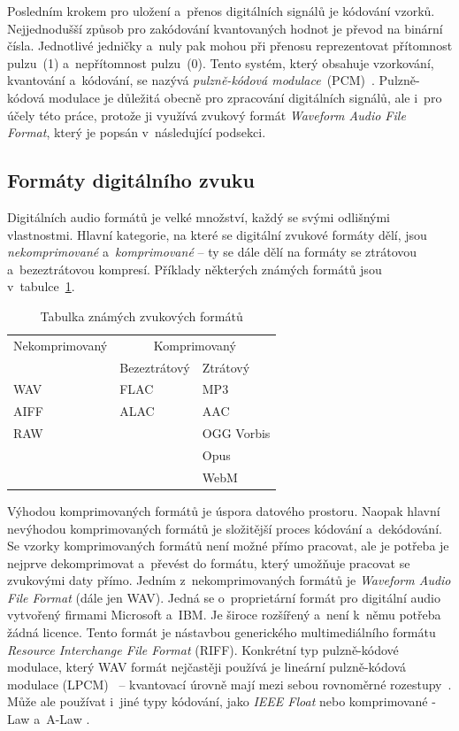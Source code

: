 Posledním krokem pro uložení a~přenos digitálních signálů je kódování vzorků.
Nejjednodušší způsob pro zakódování kvantovaných hodnot je převod na binární
čísla. Jednotlivé jedničky a~nuly pak mohou při přenosu reprezentovat
přítomnost pulzu~(1) a~nepřítomnost pulzu~(0). Tento systém, který obsahuje
vzorkování, kvantování a~kódování, se nazývá \textit{pulzně-kódová
modulace}~(PCM)~\cite{Oliver1948}. Pulzně-kódová modulace je důležitá obecně
pro zpracování digitálních signálů, ale i~pro účely této práce, protože ji
využívá zvukový formát \textit{Waveform Audio File Format}, který je popsán
v~následující podsekci.

\subsection*{Formáty digitálního zvuku}
\label{sub:digital-audio-formats}

Digitálních audio formátů je velké množství, každý se svými odlišnými
vlastnostmi. Hlavní kategorie, na které se digitální zvukové formáty dělí, jsou
\textit{nekomprimované} a~\textit{komprimované} -- ty se dále dělí na formáty
se ztrátovou a~bezeztrátovou kompresí. Příklady některých známých formátů jsou
v~tabulce~\ref{tab:audio-formats}.

\begin{table}[H]
    \vskip6pt
    \caption{Tabulka známých zvukových formátů}
    \vskip6pt
    \centering
    \begin{tabular}{lll}
        \toprule
        Nekomprimovaný & \multicolumn{2}{c}{Komprimovaný} \\
        \cmidrule(r){2-3}
                       & Bezeztrátový & Ztrátový \\
        \midrule
        WAV  & FLAC & MP3 \\
        AIFF & ALAC & AAC \\
        RAW  &      & OGG Vorbis \\
             &      & Opus \\
             &      & WebM \\
        \bottomrule
    \end{tabular}
    \label{tab:audio-formats}
\end{table}

Výhodou komprimovaných formátů je úspora datového prostoru. Naopak hlavní
nevýhodou komprimovaných formátů je složitější proces kódování a~dekódování. Se
vzorky komprimovaných formátů není možné přímo pracovat, ale je potřeba je
nejprve dekomprimovat a~převést do formátu, který umožňuje pracovat se
zvukovými daty přímo. Jedním z~nekomprimovaných formátů je \textit{Waveform
Audio File Format} (dále jen WAV). Jedná se o~proprietární formát pro digitální
audio vytvořený firmami Microsoft a~IBM. Je široce rozšířený a~není k~němu
potřeba žádná licence. Tento formát je nástavbou generického multimediálního
formátu \textit{Resource Interchange File Format} (RIFF). Konkrétní typ
pulzně-kódové modulace, který WAV formát nejčastěji používá je lineární
pulzně-kódová modulace (LPCM)~\cite{RFC2361} -- kvantovací úrovně mají mezi
sebou rovnoměrné rozestupy~\cite{LPCM}. Může ale používat i~jiné typy kódování,
jako \textit{IEEE Float} nebo komprimované \textmu-Law a~A-Law \cite{RFC2361}.

